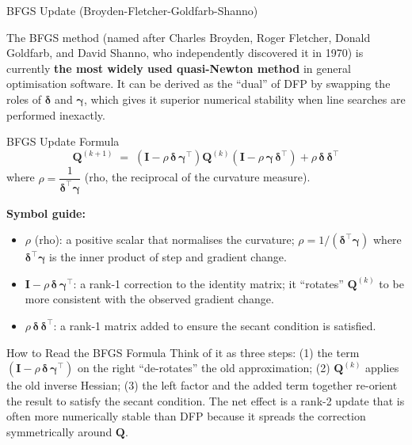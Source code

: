 \documentclass[aspectratio=169,10pt]{beamer}
\newcommand{\Ibf}{\mathbf{I}}
\newcommand{\deltabf}{\boldsymbol{\delta}}
\newcommand{\gammabf}{\boldsymbol{\gamma}}
\begin{document}

\begin{frame}[allowframebreaks]{BFGS Update (Broyden-Fletcher-Goldfarb-Shanno)}

  The BFGS method (named after Charles Broyden, Roger Fletcher, Donald Goldfarb,
  and David Shanno, who independently discovered it in 1970) is currently
  \textbf{the most widely used quasi-Newton method} in general optimisation
  software.  It can be derived as the ``dual'' of DFP by swapping the roles of
  $\deltabf$ and $\gammabf$, which gives it superior numerical stability when line
  searches are performed inexactly.

  \begin{block}{BFGS Update Formula}
    \[
      \mathbf{Q}^{(k+1)} \;=\;
        \left(\Ibf - \rho\,\deltabf\,\gammabf^\top\right)
        \mathbf{Q}^{(k)}
        \left(\Ibf - \rho\,\gammabf\,\deltabf^\top\right)
        + \rho\,\deltabf\,\deltabf^\top
    \]
    where $\rho = \dfrac{1}{\deltabf^\top\gammabf}$ (rho, the reciprocal of the
    curvature measure).

    \textbf{Symbol guide:}
    \begin{itemize}
      \item $\rho$ (rho): a positive scalar that normalises the curvature;
        $\rho = 1/(\deltabf^\top\gammabf)$ where $\deltabf^\top\gammabf$ is the
        inner product of step and gradient change.
      \item $\Ibf - \rho\,\deltabf\,\gammabf^\top$: a rank-1 correction to the
        identity matrix; it ``rotates'' $\mathbf{Q}^{(k)}$ to be more consistent
        with the observed gradient change.
      \item $\rho\,\deltabf\,\deltabf^\top$: a rank-1 matrix added to ensure the
        secant condition is satisfied.
    \end{itemize}
  \end{block}

  \begin{alertblock}{How to Read the BFGS Formula}
    Think of it as three steps: (1) the term $(\Ibf - \rho\,\deltabf\,\gammabf^\top)$
    on the right ``de-rotates'' the old approximation; (2) $\mathbf{Q}^{(k)}$
    applies the old inverse Hessian; (3) the left factor and the added term
    together re-orient the result to satisfy the secant condition.  The net effect
    is a rank-2 update that is often more numerically stable than DFP because it
    spreads the correction symmetrically around $\mathbf{Q}$.
  \end{alertblock}


\end{frame}
\end{document}
